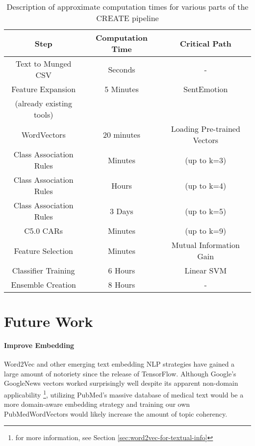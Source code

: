 \begin{table} 
\centering
\begin{tabular}{|c|c|c|} 
     \hline
     Step & Computation Time & Critical Path \\
     \hline
     Text to Munged CSV & Seconds & -  \\
     Feature Expansion & 5 Minutes & SentEmotion \\
     (already existing tools) & & \\
     WordVectors & 20 minutes & Loading Pre-trained Vectors  \\
     Class Association Rules & Minutes & (up to k=3)  \\
     Class Association Rules & Hours & (up to k=4)  \\
     Class Association Rules & 3 Days & (up to k=5)  \\
     C5.0 CARs & Minutes & (up to k=9)  \\
     Feature Selection & Minutes & Mutual Information Gain \\
     Classifier Training & 6 Hours & Linear SVM \\
     Ensemble Creation & 8 Hours & - \\
     \hline
\end{tabular}
\caption{Description of approximate computation times for various parts of the CREATE  pipeline}
\label{tab:costs}
\end{table}




\section{Future Work}

\paragraph{Improve Embedding} \textsf{Word2Vec} and other emerging text embedding NLP strategies have gained a large amount of notoriety since the release of TensorFlow. Although Google's \textsf{GoogleNews} vectors worked surprisingly well despite its apparent non-domain applicability \footnote{for more information, see Section \ref{sec:word2vec-for-textual-info}}, utilizing PubMed's massive database of medical text would be a more domain-aware embedding strategy and training our own \textsf{PubMedWordVectors} would likely increase the amount of topic coherency. 

